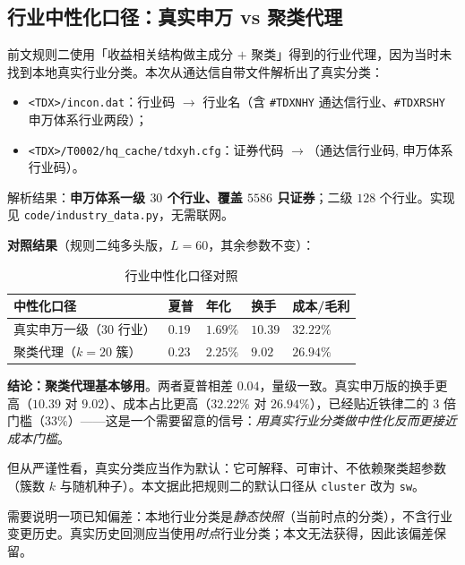 \subsection{行业中性化口径：真实申万 vs 聚类代理}

前文规则二使用「收益相关结构做主成分 $+$ 聚类」得到的行业代理，因为当时未找到本地真实行业分类。本次从通达信自带文件解析出了真实分类：

\begin{itemize}[leftmargin=2.2em]
  \item \texttt{<TDX>/incon.dat}：行业码 $\to$ 行业名（含 \texttt{\#TDXNHY} 通达信行业、\texttt{\#TDXRSHY} 申万体系行业两段）；
  \item \texttt{<TDX>/T0002/hq\_cache/tdxyh.cfg}：证券代码 $\to$（通达信行业码, 申万体系行业码）。
\end{itemize}

解析结果：\textbf{申万体系一级 $30$ 个行业、覆盖 $5586$ 只证券}；二级 $128$ 个行业。实现见 \texttt{code/industry\_data.py}，无需联网。

\textbf{对照结果}（规则二纯多头版，$L=60$，其余参数不变）：

\begin{table}[htbp]
\centering\footnotesize
\caption{行业中性化口径对照}\label{tab:indcmp}
\begin{tabular}{@{}>{\raggedright\arraybackslash}p{3.6cm}>{\raggedright\arraybackslash}p{2.0cm}>{\raggedright\arraybackslash}p{2.0cm}>{\raggedright\arraybackslash}p{2.0cm}>{\raggedright\arraybackslash}p{2.4cm}@{}}
\toprule
\textbf{中性化口径} & \textbf{夏普} & \textbf{年化} & \textbf{换手} & \textbf{成本/毛利} \\
\midrule
真实申万一级（$30$ 行业） & $0.19$ & $1.69\%$ & $10.39$ & $32.22\%$ \\
聚类代理（$k=20$ 簇） & $0.23$ & $2.25\%$ & $9.02$ & $26.94\%$ \\
\bottomrule
\end{tabular}
\end{table}

\textbf{结论：聚类代理基本够用}。两者夏普相差 $0.04$，量级一致。真实申万版的换手更高（$10.39$ 对 $9.02$）、成本占比更高（$32.22\%$ 对 $26.94\%$），已经贴近铁律二的 $3$ 倍门槛（$33\%$）——这是一个需要留意的信号：\emph{用真实行业分类做中性化反而更接近成本门槛}。

但从严谨性看，真实分类应当作为默认：它可解释、可审计、不依赖聚类超参数（簇数 $k$ 与随机种子）。本文据此把规则二的默认口径从 \texttt{cluster} 改为 \texttt{sw}。

需要说明一项已知偏差：本地行业分类是\emph{静态快照}（当前时点的分类），不含行业变更历史。真实历史回测应当使用\emph{时点}行业分类；本文无法获得，因此该偏差保留。

